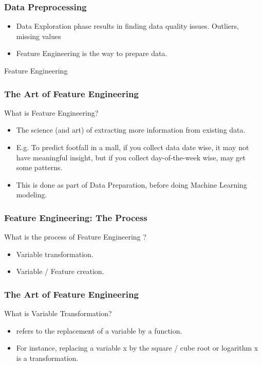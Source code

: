 \begin{frame}[fragile]\frametitle{Data Preprocessing}	
\begin{itemize}
\item Data Exploration phase results in finding data quality issues. Outliers, missing values
\item Feature Engineering is the way to prepare data.

\end{itemize}
\end{frame}


\begin{frame}
  \begin{center}
    {\Large Feature Engineering}
  \end{center}
\end{frame}



\begin{frame}[fragile]\frametitle{The Art of Feature Engineering}
What is Feature Engineering? 
	\begin{itemize}
	\item The science (and art) of extracting more information from existing data. 
\item E.g. To predict footfall in a mall, if you collect data date wise, it may not have meaningful insight, but if you collect day-of-the-week wise, may get some patterns.
\item This is done as part of Data Preparation, before doing Machine Learning modeling.
	\end{itemize}
\end{frame}

\begin{frame}[fragile]\frametitle{Feature Engineering: The Process}
What is the process of Feature Engineering ?
	\begin{itemize}
	\item Variable transformation. 
	\item Variable / Feature creation. 
	\end{itemize}
\end{frame}


\begin{frame}[fragile]\frametitle{The Art of Feature Engineering}
What is Variable Transformation? 
	\begin{itemize}
	\item  refers to the replacement of a variable by a function.
\item For 
instance, replacing a variable x by the square / cube root or logarithm x is a transformation.

	\end{itemize}
\end{frame}


